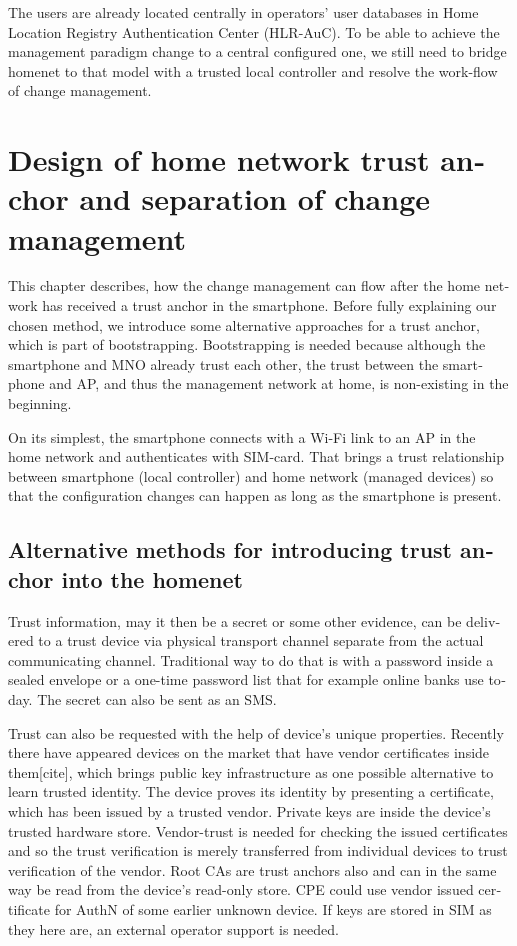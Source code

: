 \documentclass[12pt,a4paper,english]{tutthesis}
\begin{document}
\begin{otherlanguage}{english}
The users are already located centrally in operators' user databases
in Home Location Registry Authentication Center (HLR-AuC).  To be able
to achieve the management paradigm change to a central configured one,
we still need to bridge homenet to that model with a trusted local controller
and resolve the work-flow of change management.


\chapter{Design of home network trust anchor and separation of change management}
\label{sec-4}




This chapter describes, how the change management can flow after the
home network has received a trust anchor in the smartphone.  Before
fully explaining our chosen method, we introduce some alternative
approaches for a trust anchor, which is part of bootstrapping.
Bootstrapping is needed because although the smartphone and MNO
already trust each other, the trust between the smartphone and AP, and
thus the management network at home, is non-existing in the
beginning.

On its simplest, the smartphone connects with a Wi-Fi link to an
AP in the home network and authenticates with SIM-card.
That brings a trust relationship between smartphone (local controller)
and home network (managed devices) so that the configuration changes can
happen as long as the smartphone is present.

\section{Alternative methods for introducing trust anchor into the homenet}
\label{sec-4-1}




 Trust information, may it then be a secret or some
other evidence, can be delivered to a trust device via physical
transport channel separate from the actual communicating channel.
Traditional way to do that is with a password inside a sealed
envelope or a one-time password list that for example online banks 
use today. The secret can also be sent as an SMS.

Trust can also be requested with the help of device's
unique properties. Recently there have appeared  devices on the market that
have vendor certificates inside them[cite], which brings public key
infrastructure as one possible alternative to learn trusted identity. 
The device proves its identity by presenting a certificate, which has
been issued by a trusted vendor.  Private keys are inside the device's
trusted hardware store. Vendor-trust is needed for checking the issued certificates
and so the trust verification is merely transferred from individual
devices to trust verification of the vendor.  Root CAs are trust anchors
also and can in the same way be read from the device's read-only store.
CPE could use vendor issued certificate for AuthN of some earlier
unknown device.  If keys are stored in SIM as they here are, an
external operator support is needed.



\end{otherlanguage}
\end{document}

